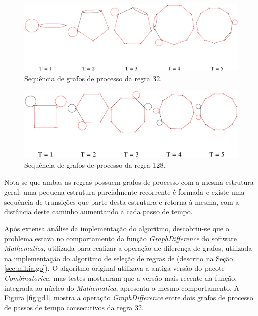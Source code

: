 \documentclass[12pt,a4paper]{article}
\begin{document}
\begin{figure}[htp]
\begin{center}
\includegraphics[scale=0.70]{img/Rule32.eps}
\caption{Sequência de grafos de processo da regra 32.}
\label{fig:r32t}
\end{center}
\end{figure}

\begin{figure}[htp]
\begin{center}
\includegraphics[scale=0.70]{img/Rule128.eps}
\caption{Sequência de grafos de processo da regra 128.}
\label{fig:r128t}
\end{center}
\end{figure}

Nota-se que ambas as regras possuem grafos de processo com a mesma estrutura geral:
uma pequena estrutura parcialmente recorrente é formada e existe
uma sequência de transições que parte desta estrutura e retorna à mesma, com
a distância deste caminho aumentando a cada passo de tempo.

Após extensa análise da implementação do algoritmo, descobriu-se que o
problema estava no comportamento da função \textit{GraphDifference} do
software \textit{Mathematica}, utilizada para realizar a operação de
diferença de grafos, utilizada na implementação do algoritmo de seleção de regras de
 (descrito na Seção \ref{sec:mikialgo}).
O algoritmo original utilizava a antiga versão do pacote
\textit{Combinatorica}, mas testes mostraram que a versão mais recente da
função, integrada ao núcleo do \textit{Mathematica}, apresenta o mesmo
comportamento. A Figura \ref{fig:gd1} mostra a operação
\textit{GraphDifference} entre dois grafos de processo de passos de tempo
consecutivos da regra 32.
\end{document}
